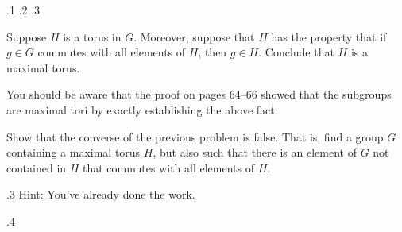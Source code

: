 \documentclass[minion]{homework}
\begin{document}
\begin{problems}
.1
.2
.3

\problem  Suppose $H$ is a torus in $G$.  Moreover,
suppose that $H$ has the property that if $g\in G$
commutes with all elements of $H$, then $g\in H$.
Conclude that $H$ is a maximal torus.

You should be aware that the proof on pages 64--66 showed
that the subgroups are maximal tori by exactly 
establishing the above fact.

\problem Show that the converse of the previous problem is false.
That is, find a group $G$ containing a maximal torus $H$, but
also such that there is an element of $G$ not contained in $H$
that commutes with all elements of $H$.

.3 Hint: You've already done the work.

.4

\end{problems}
\end{document}
